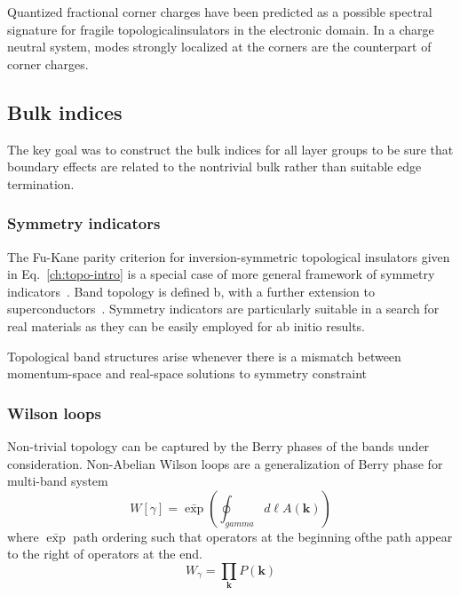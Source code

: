 Quantized  fractional  corner  charges  have  been  predicted  as  a  possible  spectral  signature  for  fragile  topologicalinsulators in the electronic domain.  In a charge neutral system, modes strongly localized at the corners are the counterpart of corner charges.


\subsection{Bulk indices}
The key goal was to construct the bulk indices for all layer groups to be sure that boundary effects are related to the nontrivial bulk rather than suitable edge termination.



\subsubsection{Symmetry indicators}
The Fu-Kane parity criterion for inversion-symmetric topological insulators given in Eq.~\ref{ch:topo-intro} is a special case of more general framework of symmetry indicators~\cite{Po2017}. Band topology is defined b, with a further extension to superconductors~\cite{PhysRevResearch.1.013012}. Symmetry indicators are particularly suitable in a search for real materials as they can be easily employed for ab initio results.

Topological band structures arise whenever there is a mismatch between momentum-space and real-space solutions to symmetry constraint




\subsubsection{Wilson loops}
Non-trivial topology can be captured by the Berry phases of the bands under consideration.  Non-Abelian Wilson loops are a generalization of Berry phase for multi-band system
\begin{equation}
W[\gamma] = \bar{\exp} \left( \oint_{gamma}  d \ell A (\mathbf{k}) \right)
\label{eq:wilson2}
\end{equation}
where $ \bar{\exp}$  path ordering such that operators at the beginning ofthe path appear to the right of operators at the end. 
\begin{equation}
W_{\gamma} = \prod_{\mathbf{k}} P ( \mathbf{k}) 
\label{eq:wilson}
\end{equation}

